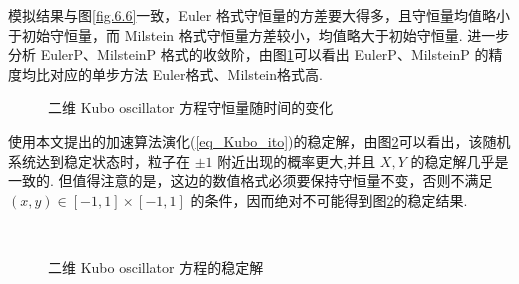模拟结果与图\ref{fig.6.6}一致，Euler 格式守恒量的方差要大得多，且守恒量均值略小于初始守恒量，而 Milstein 格式守恒量方差较小，均值略大于初始守恒量. 进一步分析 EulerP、MilsteinP 格式的收敛阶，由图\ref{fig.6.8}可以看出 EulerP、MilsteinP 的精度均比对应的单步方法 Euler格式、Milstein格式高. 
\begin{figure}[!htbp]
	\centering 
	\vspace{.2cm}
	\caption{二维 Kubo oscillator 方程守恒量随时间的变化}
	\label{fig.6.8}
\end{figure}


使用本文提出的加速算法演化(\ref{eq_Kubo_ito})的稳定解，由图\ref{fig.6.9}可以看出，该随机系统达到稳定状态时，粒子在 $\pm 1$ 附近出现的概率更大,并且 $X,Y$ 的稳定解几乎是一致的. 但值得注意的是，这边的数值格式必须要保持守恒量不变，否则不满足 $(x,y) \in [-1,1]\times [-1,1]$ 的条件，因而绝对不可能得到图\ref{fig.6.9}的稳定结果. 

\

\begin{figure}[!htbp]
	\centering 
	\vspace{.2cm}
	\caption{二维 Kubo oscillator 方程的稳定解}
	\label{fig.6.9}
\end{figure}




